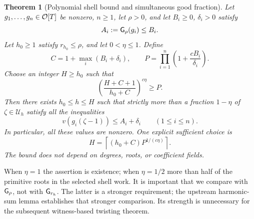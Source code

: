 \documentclass[11pt]{article}
\newtheorem{theorem}{Theorem}[section]
\theoremstyle{remark}\newtheorem{remark}[theorem]{Remark}
\begin{document}
\begin{theorem}[Polynomial shell bound and simultaneous good fraction]\label{thm:one}
Let $g_1,\ldots,g_n\in\mathcal O[T]$ be nonzero, $n\ge1$, let $\rho>0$,
and let $B_i\ge0$, $\delta_i>0$ satisfy
\[
 A_i:=\mathsf G_\rho(g_i)\le B_i.
\]
Let $h_0\ge1$ satisfy $r_{h_0}\le\rho$, and let $0<\eta\le1$. Define
\begin{equation}\label{eq:constants}
 C=1+\max_i(B_i+\delta_i),\qquad
 P=\prod_{i=1}^n\left(1+\frac{cB_i}{\delta_i}\right).
\end{equation}
Choose an integer $H\ge h_0$ such that
\begin{equation}\label{eq:Hcondition}
 \left(\frac{H+C+1}{h_0+C}\right)^{c\eta}\ge P.
\end{equation}
Then there exists $h_0\le h\le H$ such that strictly more than a fraction
$1-\eta$ of $\zeta\in\mathcal U_h$ satisfy \emph{all} the inequalities
\begin{equation}\label{eq:desired}
 v(g_i(\zeta-1))\le A_i+\delta_i\qquad(1\le i\le n).
\end{equation}
In particular, all these values are nonzero. One explicit sufficient
choice is
\begin{equation}\label{eq:H}
 H=\left\lceil (h_0+C)P^{1/(c\eta)}\right\rceil.
\end{equation}
The bound does not depend on degrees, roots, or coefficient fields.
\end{theorem}

When $\eta=1$ the assertion is existence; when $\eta=1/2$ more than
half of the primitive roots in the selected shell work. It is important
that we compare with $\mathsf G_\rho$, not with $\mathsf G_{r_h}$. The latter
is a stronger requirement; the upstream harmonic-sum lemma establishes
that stronger comparison. Its strength is unnecessary for the subsequent
witness-based twisting theorem.
\end{document}
